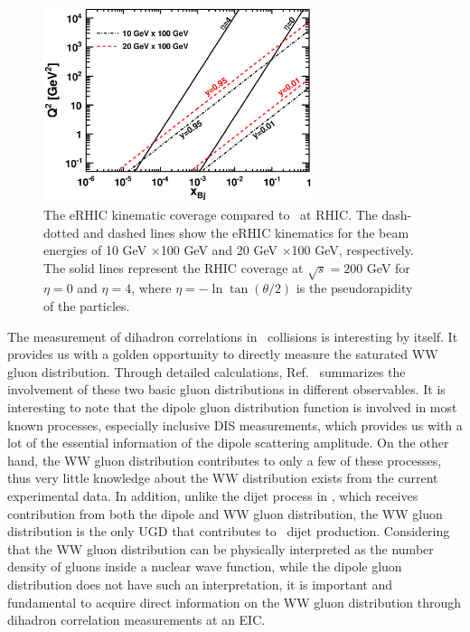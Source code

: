 \begin{figure}[hbt] 
\begin{center}
\includegraphics[width=0.7\textwidth]{plots/chpt6/eAvsdA_kinematics.eps} 
\end{center} 
\caption[The kinematic coverage of eRHIC compared with RHIC in the $Q^{2}-x$ plane]
{The eRHIC kinematic coverage compared to \pA\ at RHIC. The dash-dotted and dashed
lines show the eRHIC kinematics for the beam energies of 10 GeV
$\times$100 GeV and 20 GeV $\times$100 GeV, respectively. The solid lines 
represent the RHIC coverage at $\sqrt{s}=200$ GeV for $\eta=0$ and $\eta=4$, where
$\eta=-\ln\tan(\theta/2)$ is the pseudorapidity of the particles.
\label{fig:eAvspA_kinematics}}
\end{figure}

The measurement of dihadron correlations in \eA\ collisions is
interesting by itself. It provides us with a golden opportunity to directly
measure the saturated WW gluon distribution. Through detailed calculations,
Ref.~\cite{Dominguez:2011wm} summarizes the involvement of these two basic
gluon distributions in different observables. It is interesting
to note that the dipole gluon distribution function is involved in most
known processes, especially inclusive DIS measurements, which provides us with a
lot of the essential information of the dipole scattering amplitude. On the
other hand, the WW gluon distribution contributes to only a few of these
processes, thus very little knowledge about the WW distribution exists from
the current experimental data. In addition, unlike the dijet process in \pA,
which receives contribution from both the dipole and WW gluon distribution, the WW gluon
distribution is the only UGD that contributes to \eA\ dijet production. Considering
that the WW gluon distribution can be physically interpreted as the number density
of gluons inside a nuclear wave function, while the dipole gluon distribution
does not have such an interpretation, it is important and fundamental to
acquire direct information on the WW gluon distribution through dihadron
correlation measurements at an EIC.



